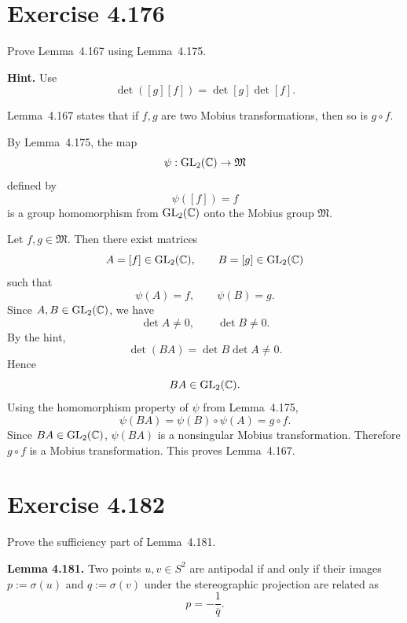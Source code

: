 \documentclass{article}
\providecommand{\Mob}{\mathfrak{M}}
\providecommand{\GL}{\operatorname{GL}}
\begin{document}
\section{Exercise 4.176}

Prove Lemma~4.167 using Lemma~4.175.

\textbf{Hint.} Use
\[
  \det([g][f])=\det[g]\det[f].
\]

\begin{solution}
  Lemma~4.167 states that if $f,g$ are two Mobius transformations, then so is
  $g\circ f$.

  By Lemma~4.175, the map
  \[
    \psi:\GL_2(\C)\to\Mob
  \]
  defined by
  \[
    \psi([f])=f
  \]
  is a group homomorphism from $\GL_2(\C)$ onto the Mobius group $\Mob$.

  Let $f,g\in\Mob$. Then there exist matrices
  \[
    A=[f]\in\GL_2(\C),
    \qquad
    B=[g]\in\GL_2(\C)
  \]
  such that
  \[
    \psi(A)=f,
    \qquad
    \psi(B)=g.
  \]
  Since $A,B\in\GL_2(\C)$, we have
  \[
    \det A\ne0,
    \qquad
    \det B\ne0.
  \]
  By the hint,
  \[
    \det(BA)=\det B\det A\ne0.
  \]
  Hence
  \[
    BA\in\GL_2(\C).
  \]
  Using the homomorphism property of $\psi$ from Lemma~4.175,
  \[
    \psi(BA)=\psi(B)\circ\psi(A)=g\circ f.
  \]
  Since $BA\in\GL_2(\C)$, $\psi(BA)$ is a nonsingular Mobius transformation.
  Therefore $g\circ f$ is a Mobius transformation. This proves Lemma~4.167.
\end{solution}

\section{Exercise 4.182}

Prove the sufficiency part of Lemma~4.181.

\textbf{Lemma 4.181.}
Two points $u,v\in S^2$ are antipodal if and only if their images
$p:=\sigma(u)$ and $q:=\sigma(v)$ under the stereographic projection are
related as
\[
  p=-\frac1{\overline q}.
\]
\end{document}

